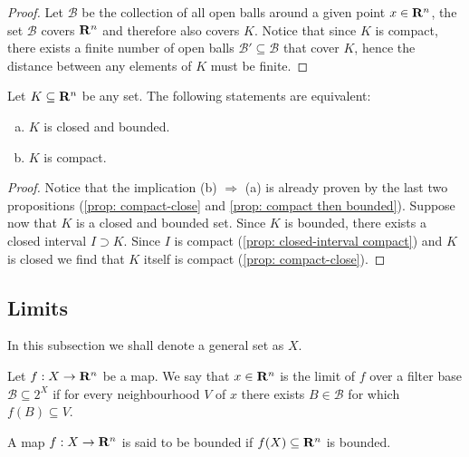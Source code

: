 \begin{proof}
Let \(\mathcal B\) be the collection of all open balls around a given point
\(x \in \mathbf{R}^n\), the set \(\mathcal B\) covers \(\mathbf{R}^n\) and therefore also
covers \(K\). Notice that since \(K\) is compact, there exists a finite number
of open balls \(\mathcal B' \subseteq \mathcal B\) that cover \(K\), hence the
distance between any elements of \(K\) must be finite.
\end{proof}

\begin{theorem}\label{heine-borel}
Let \(K \subseteq \mathbf{R}^n\) be any set. The following statements are equivalent:
\begin{enumerate}[(a)]
\item \(K\) is closed and bounded.
\item \(K\) is compact.
\end{enumerate}
\end{theorem}

\begin{proof}
Notice that the implication (b) \(\Rightarrow\) (a) is already proven by the
last two propositions (\cref{prop: compact-close} and \cref{prop: compact then
bounded}). Suppose now that \(K\) is a closed and bounded set. Since \(K\) is
bounded, there exists a closed interval \(I \supset K\). Since \(I\) is
compact (\cref{prop: closed-interval compact}) and \(K\) is closed we find
that \(K\) itself is compact (\cref{prop: compact-close}).
\end{proof}

\subsection{Limits}

\begin{remark}
In this subsection we shall denote a general set as \(X\).
\end{remark}

\begin{definition}[Limit]\label{def: limit-several}
Let \(f: X \to \mathbf{R}^n\) be a map. We say that \(x \in \mathbf{R}^n\) is the limit of
\(f\) over a filter base \(\mathcal B \subseteq  2^X\) if for every
neighbourhood \(V\) of \(x\) there exists \(B \in \mathcal B\) for which
\(f(B) \subseteq V\).
\end{definition}

\begin{definition}[Bounded]\label{def: bounded-several}
A map \(f: X \to \mathbf{R}^n\) is said to be bounded if \(f(X) \subseteq \mathbf{R}^n\) is
bounded.
\end{definition}

